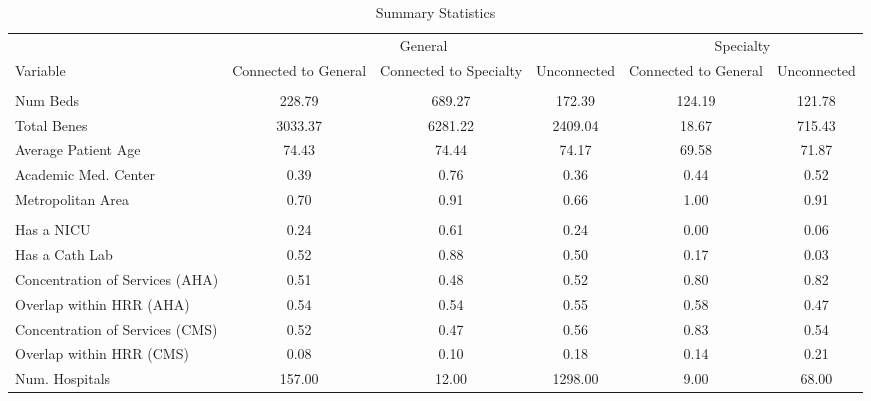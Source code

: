 \begin{table}[ht!]

\caption{Summary Statistics}
\centering
\begin{tabular}[t]{lccccc}
\toprule
\multicolumn{1}{c}{ } & \multicolumn{3}{c}{General} & \multicolumn{2}{c}{Specialty} \\
\cmidrule(l{3pt}r{3pt}){2-4} \cmidrule(l{3pt}r{3pt}){5-6}
Variable & Connected to General & Connected to Specialty & Unconnected & Connected to General & Unconnected\\
\midrule
\addlinespace[0.3em]
\multicolumn{6}{l}{\textbf{Characteristics}}\\
\hspace{1em}Num Beds & 228.79 & 689.27 & 172.39 & 124.19 & 121.78\\
\hspace{1em}Total Benes & 3033.37 & 6281.22 & 2409.04 & 18.67 & 715.43\\
\hspace{1em}Average Patient Age & 74.43 & 74.44 & 74.17 & 69.58 & 71.87\\
\hspace{1em}Academic Med. Center & 0.39 & 0.76 & 0.36 & 0.44 & 0.52\\
\hspace{1em}Metropolitan Area & 0.70 & 0.91 & 0.66 & 1.00 & 0.91\\
\addlinespace[0.3em]
\multicolumn{6}{l}{\textbf{Services}}\\
\hspace{1em}Has a NICU & 0.24 & 0.61 & 0.24 & 0.00 & 0.06\\
\hspace{1em}Has a Cath Lab & 0.52 & 0.88 & 0.50 & 0.17 & 0.03\\
\hspace{1em}Concentration of Services (AHA) & 0.51 & 0.48 & 0.52 & 0.80 & 0.82\\
\hspace{1em}Overlap within HRR (AHA) & 0.54 & 0.54 & 0.55 & 0.58 & 0.47\\
\hspace{1em}Concentration of Services (CMS) & 0.52 & 0.47 & 0.56 & 0.83 & 0.54\\
\hspace{1em}Overlap within HRR (CMS) & 0.08 & 0.10 & 0.18 & 0.14 & 0.21\\
Num. Hospitals & 157.00 & 12.00 & 1298.00 & 9.00 & 68.00\\
\bottomrule
\end{tabular}
\end{table}
